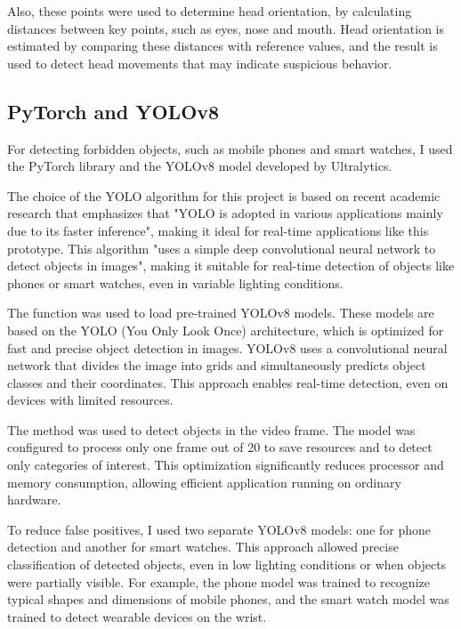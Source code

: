 \documentclass[12pt,a4paper]{article}
\let\oldtexttt\texttt
\renewcommand{\texttt}[1]{%
    \oldtexttt{\seqsplit{#1}}%
}
\begin{document}
Also, these points were used to determine head orientation, by calculating distances between key points, such as eyes, nose and mouth. Head orientation is estimated by comparing these distances with reference values, and the result is used to detect head movements that may indicate suspicious behavior.

\subsection{PyTorch and YOLOv8}
For detecting forbidden objects, such as mobile phones and smart watches, I used the PyTorch library\cite{pytorch} and the YOLOv8 model developed by Ultralytics\cite{ultralytics}.

The choice of the YOLO algorithm for this project is based on recent academic research that 
emphasizes that "YOLO is adopted in various applications mainly due to its faster 
inference"\cite{wang2022object}, making it ideal for real-time applications like this prototype. 
This algorithm "uses a simple deep convolutional neural network to detect objects 
in images"\cite{v7labs2023yolo}, making it suitable for real-time detection of objects like 
phones or smart watches, even in variable lighting conditions.

The \texttt{torch.load} function was used to load pre-trained YOLOv8 models. These models are based on the YOLO (You Only Look Once) architecture, which is optimized for fast and precise object detection in images\cite{redmon2018yolov3}. YOLOv8 uses a convolutional neural network that divides the image into grids and simultaneously predicts object classes and their coordinates. This approach enables real-time detection, even on devices with limited resources.

The \texttt{model.predict} method was used to detect objects in the video frame. The model was configured to process only one frame out of 20 to save resources and to detect only categories of interest. This optimization significantly reduces processor and memory consumption, allowing efficient application running on ordinary hardware.

To reduce false positives, I used two separate YOLOv8 models: one for phone detection and another for smart watches. This approach allowed precise classification of detected objects, even in low lighting conditions or when objects were partially visible. For example, the phone model was trained to recognize typical shapes and dimensions of mobile phones, and the smart watch model was trained to detect wearable devices on the wrist.
\end{document}
